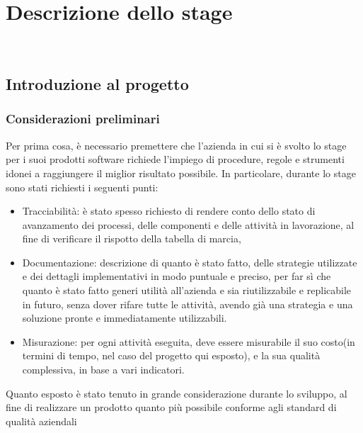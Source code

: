 
\chapter{Descrizione dello stage}
\label{cap:descrizione-stage}

\\

\section{Introduzione al progetto}
\subsection{Considerazioni preliminari}
Per prima cosa, è necessario premettere che l'azienda in cui si è svolto lo stage per i suoi prodotti software richiede l'impiego di procedure, regole e strumenti idonei a raggiungere il miglior risultato possibile.
In particolare, durante lo stage sono stati richiesti i seguenti punti:
\begin{itemize}
\item Tracciabilità: è stato spesso richiesto di rendere conto dello stato di avanzamento dei processi, delle componenti e delle attività in lavorazione, al fine di verificare il rispotto della tabella di marcia,
\item Documentazione: descrizione di quanto è stato fatto, delle strategie utilizzate e dei dettagli implementativi in modo puntuale e preciso, per far sì che quanto è stato fatto generi utilità all'azienda e sia riutilizzabile e replicabile in futuro, senza dover rifare tutte le attività, avendo già una strategia e una soluzione pronte e immediatamente utilizzabili.
\item Misurazione: per ogni attività eseguita, deve essere misurabile il suo costo(in termini di tempo, nel caso del progetto qui esposto), e la sua qualità complessiva, in base a vari indicatori.
\end{itemize}
Quanto esposto è stato tenuto in grande considerazione durante lo sviluppo, al fine di realizzare un prodotto quanto più possibile conforme agli standard di qualità aziendali
